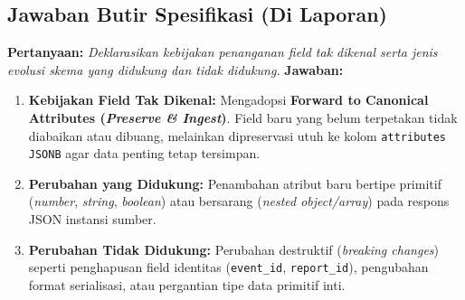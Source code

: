 \subsection{Jawaban Butir Spesifikasi (Di Laporan)}
\textbf{Pertanyaan:} \textit{Deklarasikan kebijakan penanganan field tak dikenal serta jenis evolusi skema yang didukung dan tidak didukung.} \textbf{Jawaban:}
\begin{enumerate}
    \item \textbf{Kebijakan Field Tak Dikenal:} Mengadopsi \textbf{Forward to Canonical Attributes (\textit{Preserve \& Ingest})}. Field baru yang belum terpetakan tidak diabaikan atau dibuang, melainkan dipreservasi utuh ke kolom \texttt{attributes JSONB} agar data penting tetap tersimpan.
    \item \textbf{Perubahan yang Didukung:} Penambahan atribut baru bertipe primitif (\textit{number}, \textit{string}, \textit{boolean}) atau bersarang (\textit{nested object/array}) pada respons JSON instansi sumber.
    \item \textbf{Perubahan Tidak Didukung:} Perubahan destruktif (\textit{breaking changes}) seperti penghapusan field identitas (\texttt{event\_id}, \texttt{report\_id}), pengubahan format serialisasi, atau pergantian tipe data primitif inti.
\end{enumerate}
